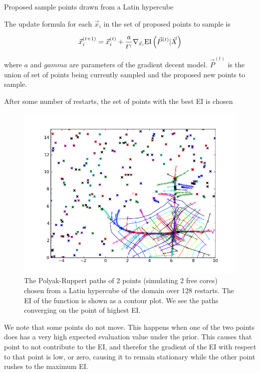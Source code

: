\documentclass[phd,tocprelim]{cornell}
\begin{document}
Proposed sample points drawn from a Latin hypercube

The update formula for each $\vec{x}_{i}$ in the set of proposed points to sample is

\begin{equation}
    \vec{x}_{i}^{(t+1)} = \vec{x}_{i}^{(t)} + \frac{a}{t^{\gamma}} \nabla_{\vec{x}_{i}} {\rm EI}\left(\vec{P}^{(t)} | \vec{X}\right)
\end{equation}

where $a$ and $gamma$ are parameters of the gradient decent model. $\vec{P}^{(t)}$ is the union of set of points being currently sampled and the proposed new points to sample.

After some number of restarts, the set of points with the best EI is chosen

\begin{figure}[hpt]
 	\centerline{\includegraphics[width=\textwidth]{figures/EPI/branin_2d_32pk_paths_and_EI.png}}
    \caption[Polyak-Ruppert paths in Branin Function]{The Polyak-Ruppert paths of 2 points (simulating 2 free cores) chosen from a Latin hypercube of the domain over 128 restarts. The EI of the function is shown as a contour plot. We see the paths converging on the point of highest EI.}
 	\label{fig:pk_paths}
 \end{figure}

We note that some points do not move. This happens when one of the two points does has a very high expected evaluation value under the prior. This causes that point to not contribute to the EI, and therefor the gradient of the EI with respect to that point is low, or zero, causing it to remain stationary while the other point rushes to the maximum EI.
\end{document}
